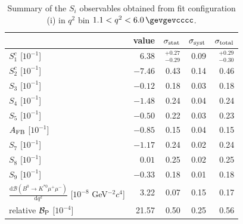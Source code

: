 \begin{table}\centering
\caption{Summary of the $S_{i}$ observables obtained from fit configuration (i) in $q^{2}$ bin \mbox{$1.1 < q^{2} < 6.0\,\gevgevcccc$}.}
\label{sec:fit_results:si_s1c:table:summary_bin8}
\begin{tabular}{lrrrr}
\toprule
 & value & $\sigma_{\rm stat}$ & $\sigma_{\rm syst}$ & $\sigma_{\rm total}$ \\
\midrule
$S_{1}^{c}$ [$ 10^{-1}$] & $6.38$ & $^{+0.27}_{-0.29}$ & 0.09 & $^{+0.29}_{-0.30}$ \\
$S_{2}^{c}$ [$ 10^{-1}$] & $-7.46$ & 0.43 & 0.14 & 0.46 \\
$S_{3}$ [$ 10^{-1}$] & $-0.12$ & 0.18 & 0.03 & 0.18 \\
$S_{4}$ [$ 10^{-1}$] & $-1.48$ & 0.24 & 0.04 & 0.24 \\
$S_{5}$ [$ 10^{-1}$] & $-0.50$ & 0.22 & 0.03 & 0.23 \\
$A_{\rm FB}$ [$ 10^{-1}$] & $-0.85$ & 0.15 & 0.04 & 0.15 \\
$S_{7}$ [$ 10^{-1}$] & $-1.17$ & 0.24 & 0.02 & 0.24 \\
$S_{8}$ [$ 10^{-1}$] & $0.01$ & 0.25 & 0.02 & 0.25 \\
$S_{9}$ [$ 10^{-1}$] & $-0.33$ & 0.18 & 0.01 & 0.18 \\
\midrule
$\frac{\mathrm{d}\mathcal{B}(B^{0}\to K^{\ast 0}\mu^{+}\mu^{-})}{\mathrm{d} q^{2}}$ [$ 10^{-8}$ GeV$^{-2}c^{4}$] & 3.22 & 0.07 & 0.15 & 0.17 \\
relative $\mathcal{B}_{\rm P}$ [$10^{-4}$] & 21.57 & 0.50 & 0.25 & 0.56 \\
\bottomrule
\end{tabular}
\end{table}
